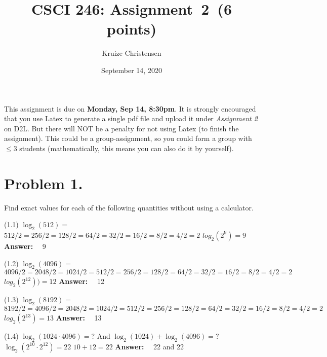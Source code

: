 \documentclass[11pt]{article}
\begin{document}
\date{September 14, 2020}

\title{CSCI 246: Assignment~2~(6 points)}

\author{Kruize Christensen}

\maketitle


\noindent
This assignment is due on {\bf Monday, Sep 14, 8:30pm}. It is strongly
encouraged that you use Latex to generate a single pdf file and upload it
under {\em Assignment 2} on D2L. But there will NOT be a penalty for not
using Latex (to finish the assignment). This could be a group-assignment,
so you could form a group with $\leq 3$ students (mathematically, this means
you can also do it by yourself).
\newline
 
\section*{Problem 1.}

\noindent
Find exact values for each of the following quantities without using a calculator. 
\newline

\noindent
(1.1) $\log_2(512)=$
\newline
\newline
$512/2=256/2=128/2=64/2=32/2=16/2=8/2=4/2=2$
\newline
$log_2(2^9)=9$
\newline
\noindent
{\bf Answer:}~~ 9
\newline

\noindent
(1.2) $\log_2(4096)=$
\newline
\newline
$4096/2=2048/2=1024/2=512/2=256/2=128/2=64/2=32/2=16/2=8/2=4/2=2$
\newline
$log_2(2^{12}))=12$
\newline
\noindent
{\bf Answer:}~~ 12
\newline

\noindent
(1.3) $\log_2(8192)=$
\newline
\newline
$8192/2=4096/2=2048/2=1024/2=512/2=256/2=128/2=64/2=32/2=16/2=8/2=4/2=2$
\newline
$log_2(2^{13})=13$
\newline
\noindent
{\bf Answer:}~~ 13


\noindent
(1.4) $\log_2(1024\cdot 4096)=$?  And $\log_2(1024)+\log_2(4096)=$?
\newline
\newline
$\log_2(2^{10}\cdot 2^{12})=22$
\newline
$10+12=22$
\newline
\noindent
{\bf Answer:}~~ 22 and 22
\newline
\end{document}
